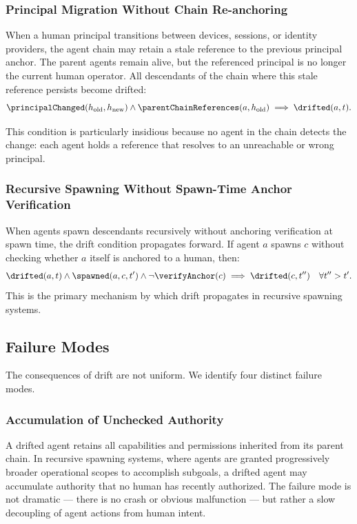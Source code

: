 \subsubsection{Principal Migration Without Chain Re-anchoring}

When a human principal transitions between devices, sessions, or identity providers, the agent chain may retain a stale reference to the previous principal anchor. The parent agents remain alive, but the referenced principal is no longer the current human operator. All descendants of the chain where this stale reference persists become drifted:
\[
\principalChanged(h_{\text{old}}, h_{\text{new}}) \land \parentChainReferences(a, h_{\text{old}}) \implies \drifted(a, t).
\]

This condition is particularly insidious because no agent in the chain detects the change: each agent holds a reference that resolves to an unreachable or wrong principal.

\subsubsection{Recursive Spawning Without Spawn-Time Anchor Verification}

When agents spawn descendants recursively without anchoring verification at spawn time, the drift condition propagates forward. If agent $a$ spawns $c$ without checking whether $a$ itself is anchored to a human, then:
\[
\drifted(a, t) \land \spawned(a, c, t') \land \neg \verifyAnchor(c) \implies \drifted(c, t'')\quad \forall t'' > t'.
\]
This is the primary mechanism by which drift propagates in recursive spawning systems.

\subsection{Failure Modes}

The consequences of drift are not uniform. We identify four distinct failure modes.

\subsubsection{Accumulation of Unchecked Authority}

A drifted agent retains all capabilities and permissions inherited from its parent chain. In recursive spawning systems, where agents are granted progressively broader operational scopes to accomplish subgoals, a drifted agent may accumulate authority that no human has recently authorized. The failure mode is not dramatic --- there is no crash or obvious malfunction --- but rather a slow decoupling of agent actions from human intent.

